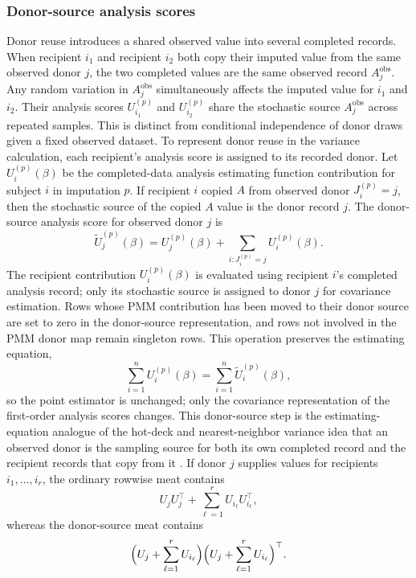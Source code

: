 \subsubsection{Donor-source analysis scores}
\label{donor-source-analysis-scores}
Donor reuse introduces a shared observed value into several completed
records. When recipient \(i_1\)
and recipient \(i_2\) both copy their imputed value from the same observed
donor \(j\), the two completed values are the same observed record
\(A_j^{\mathrm{obs}}\).  Any random variation in \(A_j^{\mathrm{obs}}\) simultaneously affects
the imputed value for \(i_1\) and \(i_2\).  Their analysis scores
\(U_{i_1}^{(p)}\) and \(U_{i_2}^{(p)}\) share the stochastic source
\(A_j^{\mathrm{obs}}\) across repeated samples. This is distinct from
conditional independence of donor draws given a fixed observed dataset.
To represent donor reuse in the variance calculation, each recipient's
analysis score is assigned to its recorded donor.
Let \(U_i^{(p)}(\beta)\) be the completed-data analysis estimating
function contribution for subject \(i\) in imputation \(p\). If recipient
\(i\) copied \(A\) from observed donor \(J_i^{(p)}=j\), then the
stochastic source of the copied \(A\) value is the donor record \(j\).
The donor-source analysis score for observed donor \(j\) is
\[
\widetilde U_j^{(p)}(\beta)
=
U_j^{(p)}(\beta)
+
\sum_{i:J_i^{(p)}=j} U_i^{(p)}(\beta).
\]
The recipient contribution \(U_i^{(p)}(\beta)\) is evaluated using
recipient \(i\)'s completed analysis record; only its stochastic source
is assigned to donor \(j\) for covariance estimation. Rows whose PMM
contribution has been moved to their donor source are set to zero in the
donor-source representation, and rows not involved in the PMM donor map
remain singleton rows. This operation preserves the estimating equation,
\[
\sum_{i=1}^n U_i^{(p)}(\beta)
=
\sum_{i=1}^n \widetilde U_i^{(p)}(\beta),
\]
so the point estimator is unchanged; only the covariance representation
of the first-order analysis scores changes.
This donor-source step is the estimating-equation analogue of the
hot-deck and nearest-neighbor variance idea that an observed donor is the
sampling source for both its own completed record and the recipient
records that copy from it
\citep{rao1992jackknife,chen2002common,kim2004fractional,yang2020pmm}.
If donor \(j\) supplies values for recipients \(i_1,\ldots,i_r\), the
ordinary rowwise meat contains
\[
U_jU_j^\top+\sum_{\ell=1}^r U_{i_\ell}U_{i_\ell}^\top,
\]
whereas the donor-source meat contains
\[
\Bigl(U_j+\sum_{\ell=1}^rU_{i_\ell}\Bigr)
\Bigl(U_j+\sum_{\ell=1}^rU_{i_\ell}\Bigr)^\top .
\]
